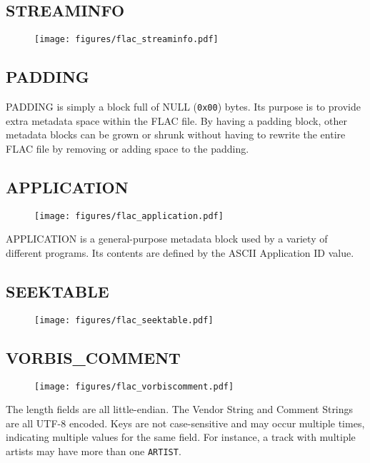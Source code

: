 \subsection{STREAMINFO}
\begin{figure}[h]
\texttt{[image: figures/flac\_streaminfo.pdf]}
\end{figure}

\subsection{PADDING}

PADDING is simply a block full of NULL (\texttt{0x00}) bytes.
Its purpose is to provide extra metadata space within the FLAC file.
By having a padding block, other metadata blocks can be grown or
shrunk without having to rewrite the entire FLAC file by removing or
adding space to the padding.


\subsection{APPLICATION}
\begin{figure}[h]
\texttt{[image: figures/flac\_application.pdf]}
\end{figure}
\noindent
APPLICATION is a general-purpose metadata block used by a variety of
different programs.
Its contents are defined by the ASCII Application ID value.

\subsection{SEEKTABLE}
\begin{figure}[h]
\texttt{[image: figures/flac\_seektable.pdf]}
\end{figure}

\pagebreak

\subsection{VORBIS\_COMMENT}
\begin{figure}[h]
\texttt{[image: figures/flac\_vorbiscomment.pdf]}
\end{figure}
\par
\noindent
The length fields are all little-endian.
The Vendor String and Comment Strings are all UTF-8 encoded.
Keys are not case-sensitive and may occur multiple times,
indicating multiple values for the same field.
For instance, a track with multiple artists may have
more than one \texttt{ARTIST}.


